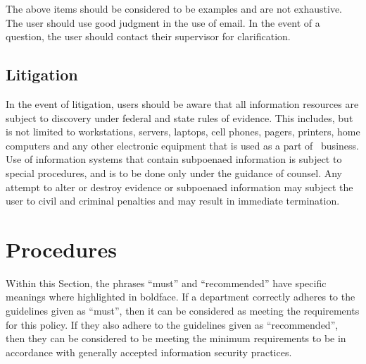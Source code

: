 \documentclass[use]{policy}
\begin{document}
			The above items should be considered to be examples and are not exhaustive.  The user should use good judgment in the use of email.  In the event of a question, the user should contact their supervisor for clarification.
		
		\subsection{Litigation}
			In the event of litigation, users should be aware that all information resources are subject to discovery under federal and state rules of evidence.  This includes, but is not limited to workstations, servers, laptops, cell phones, pagers, printers, home computers and any other electronic equipment that is used as a part of \theOrganization\  business.  Use of information systems that contain subpoenaed information is subject to special procedures, and is to be done only under the guidance of counsel.  Any attempt to alter or destroy evidence or subpoenaed information may subject the user to civil and criminal penalties and may result in immediate termination.
		
	
	\section{Procedures}
	
	Within this Section, the phrases “must” and “recommended” have specific meanings where highlighted in boldface. If a department correctly adheres to the guidelines given as “must”, then it can be considered as meeting the requirements for this policy. If they also adhere to the guidelines given as “recommended”, then they can be considered to be meeting the minimum requirements to be in accordance with generally accepted information security practices.
	
\end{document}
